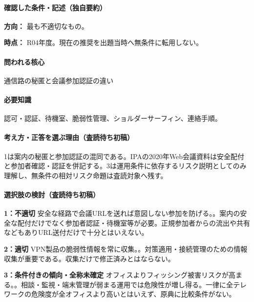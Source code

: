 \paragraph{確認した条件・記述（独自要約）}\mbox{}\par

\noindent\textbf{方向：} 最も不適切なもの。\par

\noindent\textbf{時点：} R04年度。現在の推奨を出題当時へ無条件に転用しない。\par

\paragraph{問われる核心} 通信路の秘匿と会議参加認証の違い

\paragraph{必要知識} 認可・認証、待機室、脆弱性管理、ショルダーサーフィン、連絡手順。

\paragraph{考え方・正答を選ぶ理由（査読待ち初稿）} 1は案内の秘匿と参加認証の混同である。IPAの2020年Web会議資料は安全配付と参加者確認・認証を併記する。3は運用条件に依存するリスク説明としてのみ理解し、無条件の相対リスク命題は査読対象へ残す。

\paragraph{選択肢の検討（査読待ち初稿）}\mbox{}\par

\noindent\textbf{1：不適切} 安全な経路で会議URLを送れば意図しない参加を防げる。。案内の安全な配付だけでなく参加者認証・待機室等が必要。正規参加者からの流出や共有などもありURL送付だけで十分とはいえない。\par

\noindent\textbf{2：適切} VPN製品の脆弱性情報を常に収集。。対策適用・接続管理のための情報収集が重要である。収集だけで修正済みとはならない。\par

\noindent\textbf{3：条件付きの傾向・全称未確定} オフィスよりフィッシング被害リスクが高まる。。相談・監視・端末管理が弱まる運用では危険性が増し得る。一律に全テレワークの危険度が全オフィスより高いとはいえず、原典に比較条件がない。\par

